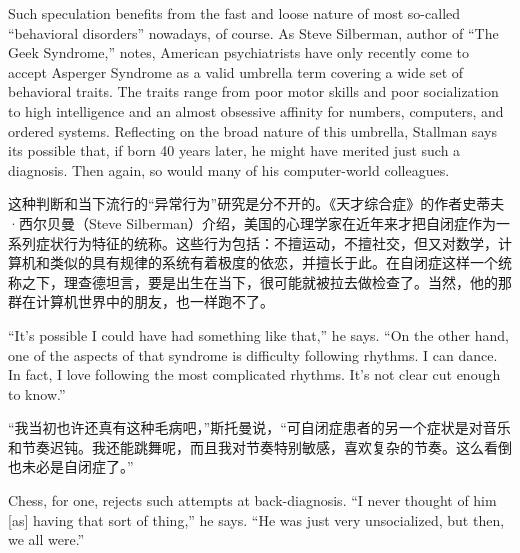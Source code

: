 \ifdefined\eng
Such speculation benefits from the fast and loose nature of most so-called ``behavioral disorders'' nowadays, of course. As Steve Silberman, author of ``The Geek Syndrome,'' notes, American psychiatrists have only recently come to accept Asperger Syndrome as a valid umbrella term covering a wide set of behavioral traits. The traits range from poor motor skills and poor socialization to high intelligence and an almost obsessive affinity for numbers, computers, and ordered systems. Reflecting on the broad nature of this umbrella, Stallman says its possible that, if born 40 years later, he might have merited just such a diagnosis. Then again, so would many of his computer-world colleagues.
\fi

\ifdefined\chs
这种判断和当下流行的``异常行为''研究是分不开的。《天才综合症》的作者史蒂夫·西尔贝曼（Steve Silberman）介绍，美国的心理学家在近年来才把自闭症作为一系列症状行为特征的统称。这些行为包括：不擅运动，不擅社交，但又对数学，计算机和类似的具有规律的系统有着极度的依恋，并擅长于此。在自闭症这样一个统称之下，理查德坦言，要是出生在当下，很可能就被拉去做检查了。当然，他的那群在计算机世界中的朋友，也一样跑不了。
\fi

\ifdefined\eng
``It's possible I could have had something like that,'' he says. ``On the other hand, one of the aspects of that syndrome is difficulty following rhythms. I can dance. In fact, I love following the most complicated rhythms. It's not clear cut enough to know.''  %
\fi

\ifdefined\chs
``我当初也许还真有这种毛病吧，''斯托曼说，``可自闭症患者的另一个症状是对音乐和节奏迟钝。我还能跳舞呢，而且我对节奏特别敏感，喜欢复杂的节奏。这么看倒也未必是自闭症了。''%
\fi

\ifdefined\eng
Chess, for one, rejects such attempts at back-diagnosis. ``I never thought of him [as] having that sort of thing,'' he says. ``He was just very unsocialized, but then, we all were.''
\fi

